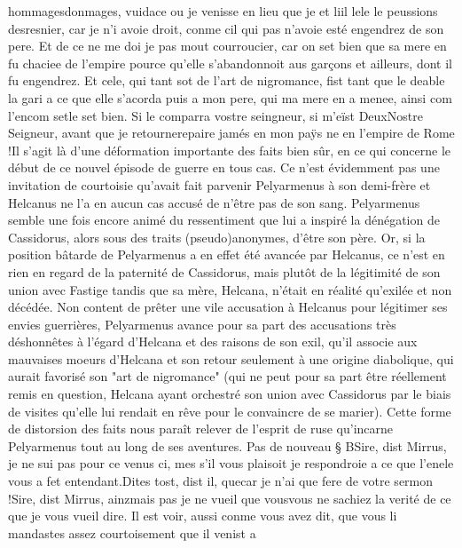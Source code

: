 \documentclass{article}
\begin{document}
\begin{pages}
      hommagesdonmages, vuidace ou je venisse en lieu que je et 
      liil 
      lele le peussions desresnier, car je n’i avoie droit, 
   conme cil qui pas n’avoie esté engendrez de son pere. 
      Et de ce ne me doi je pas mout courroucier, car on set bien que sa mere 
      en fu chaciee de l’empire pource qu’elle s’abandonnoit aus garçons et 
      ailleurs, dont il fu engendrez. Et cele, qui tant sot de l’art de nigromance, 
      fist tant que le deable la gari a ce que elle s’acorda puis a mon pere, qui 
      ma mere en a menee, ainsi 
      com l'encom 
      setle set bien. 
   Si le comparra vostre seingneur, si m’eïst 
      DeuxNostre Seigneur, avant que 
      je retournerepaire 
      jamés en mon paÿs ne en l’empire de 
      Rome !Il s'agit là d'une déformation importante des faits 
      bien sûr, en ce qui concerne le début de ce nouvel épisode de guerre en tous cas. Ce n'est évidemment pas une invitation 
      de courtoisie qu'avait fait parvenir Pelyarmenus à son demi-frère et Helcanus ne l'a en aucun cas accusé de n'être pas de son sang.
      Pelyarmenus semble une fois encore animé du ressentiment que lui a inspiré la dénégation de Cassidorus, alors sous des traits 
      (pseudo)anonymes, d'être son père. Or, si la position bâtarde de Pelyarmenus a en effet été avancée par Helcanus, ce n'est en 
      rien en regard de la paternité de Cassidorus, mais plutôt de la légitimité de son union avec Fastige tandis que sa mère, Helcana, 
      n'était en réalité qu'exilée et non décédée. Non content de prêter une vile accusation à Helcanus pour légitimer ses envies guerrières, 
      Pelyarmenus avance pour sa part des accusations très déshonnêtes à l'égard d'Helcana et des raisons de son exil, qu'il associe
      aux mauvaises moeurs d'Helcana et son retour seulement à une origine diabolique, qui aurait favorisé son "art de nigromance" 
      (qui ne peut pour sa part être réellement remis en question, Helcana ayant orchestré son union avec Cassidorus par le biais de
      visites qu'elle lui rendait en rêve pour le convaincre de se marier). Cette forme de distorsion des faits nous paraît relever 
      de l'esprit de ruse qu'incarne Pelyarmenus tout au long de ses aventures. \pend
\pstart Pas de nouveau § BSire, 
   dist Mirrus, je ne sui pas pour ce venus 
   ci, mes s’il vous plaisoit je respondroie a ce que 
   l’enele vous a fet entendant.Dites tost, dist il, quecar 
      je n’ai que fere de votre sermon !Sire, dist Mirrus, 
      ainzmais pas je ne vueil que 
      vousvous ne sachiez la verité 
   de ce que je vous vueil dire. Il est voir, aussi conme vous avez dit, que vous li mandastes assez courtoisement que il venist a 

\end{pages}
\end{document}

